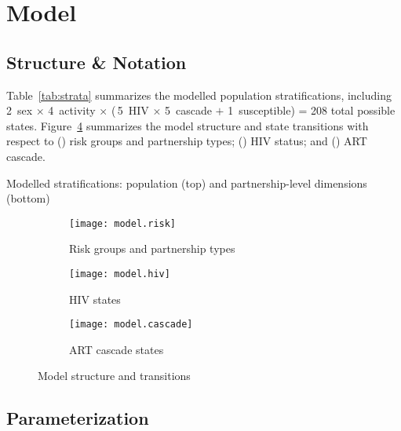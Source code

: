 \section{Model}\label{a:model}
\subsection{Structure \& Notation}\label{a:model.struc}
Table~\ref{tab:strata} summarizes the modelled population stratifications,
including 2~sex $\times$ 4~activity $\times$ (\,5~HIV $\times$ 5~cascade $+$ 1~susceptible)
= 208 total possible states.
Figure~\ref{fig:model} summarizes the model structure and state transitions with respect to
() risk groups and partnership types;
() HIV status; and
() ART cascade.
\begin{table}[h]
  \centering
  \caption{Modelled stratifications: population (top) and partnership-level dimensions (bottom)}
  
  \label{tab:strata}
\end{table}
\begin{figure}[h]
  \begin{subfigure}{\linewidth}
    \texttt{[image: model.risk]}
    \caption{Risk groups and partnership types}
    \label{fig:model.risk}
  \end{subfigure}
  \begin{subfigure}{\linewidth}
    \texttt{[image: model.hiv]}
    \caption{HIV states}
    \label{fig:model.hiv}
  \end{subfigure}
  \begin{subfigure}{\linewidth}
    \texttt{[image: model.cascade]}
    \caption{ART cascade states}
    \label{fig:model.care}
  \end{subfigure}
  \caption{Model structure and transitions}
  \label{fig:model}
\end{figure}
\subsection{Parameterization}\label{a:model.param}
\clearpage
